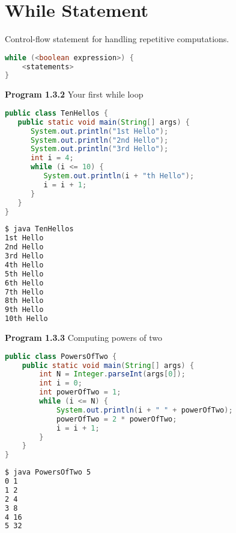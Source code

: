 \documentclass[8pt,a4paper,compress]{beamer}
\begin{document}
\section{While Statement}
\begin{frame}[fragile]
\pause
Control-flow statement for handling repetitive computations.
\begin{lstlisting}[language=Java]
while (<boolean expression>) {
    <statements>
}
\end{lstlisting}

\pause
\smallskip

\textbf{Program 1.3.2} Your first while loop

\begin{lstlisting}[language=Java]
public class TenHellos { 
   public static void main(String[] args) {
      System.out.println("1st Hello");
      System.out.println("2nd Hello");
      System.out.println("3rd Hello");
      int i = 4;
      while (i <= 10) {
         System.out.println(i + "th Hello");
         i = i + 1;
      }
   }
}
\end{lstlisting}

\pause

\begin{lstlisting}[language=bash]
$ java TenHellos 
1st Hello
2nd Hello
3rd Hello
4th Hello
5th Hello
6th Hello
7th Hello
8th Hello
9th Hello
10th Hello
\end{lstlisting}
\end{frame}

\begin{frame}[fragile]
\pause

\textbf{Program 1.3.3} Computing powers of two

\begin{lstlisting}[language=Java]
public class PowersOfTwo {
    public static void main(String[] args) {
        int N = Integer.parseInt(args[0]);
        int i = 0;
        int powerOfTwo = 1;
        while (i <= N) {
            System.out.println(i + " " + powerOfTwo);
            powerOfTwo = 2 * powerOfTwo; 
            i = i + 1;
        }
    }
}
\end{lstlisting}

\pause

\begin{lstlisting}[language=bash]
$ java PowersOfTwo 5
0 1
1 2
2 4
3 8
4 16
5 32
\end{lstlisting}
\end{frame}
\end{document}
